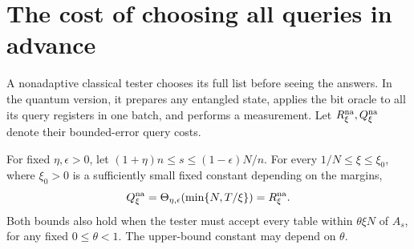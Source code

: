 \section{The cost of choosing all queries in advance}
A nonadaptive classical tester chooses its full list before seeing the answers. In the quantum version, it prepares any entangled state, applies the bit oracle to all its query registers in one batch, and performs a measurement. Let $R^{\rm na}_\xi,Q^{\rm na}_\xi$ denote their bounded-error query costs.
\begin{theorem}\label{th:nonadaptive}
For fixed $\eta,\epsilon>0$, let $(1+\eta)n\le s\le(1-\epsilon)N/n$. For every $1/N\le\xi\le\xi_0$, where $\xi_0>0$ is a sufficiently small fixed constant depending on the margins,
\[
              Q^{\rm na}_\xi=\Theta_{\eta,\epsilon}(\min\{N,T/\xi\})
                   =R^{\rm na}_\xi .
\]
Both bounds also hold when the tester must accept every table within $\theta\xi N$ of $A_s$, for any fixed $0\le\theta<1$. The upper-bound constant may depend on $\theta$.
\end{theorem}
